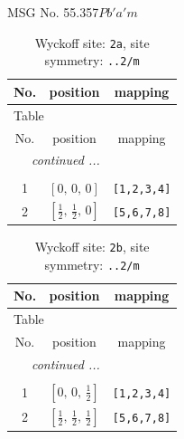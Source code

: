 \documentclass[fleqn,8pt]{jsarticle}
\begin{document}
\setcounter{MaxMatrixCols}{32}

\renewcommand{\tablename}{Table~}
\renewcommand{\figurename}{Figure~}
\begin{center}
\LARGE
MSG No. 55.357\quad$Pb'a'm$
\end{center}
\renewcommand{\arraystretch}{1.2}
\begin{longtable}{ccc}
\caption{Wyckoff site: {\tt 2a}, site symmetry: {\tt ..2/m}}
 \\
 \hline \hline
No. & position & mapping \\ \hline \endfirsthead

\multicolumn{2}{l}{\tablename\ \thetable{}} \\
 \hline \hline
No. & position & mapping \\ \hline \endhead

 \hline \hline
\multicolumn{2}{r}{\footnotesize\it continued ...} \\ \endfoot

 \hline \hline
\multicolumn{2}{r}{} \\ \endlastfoot

1 & $\left[ 0,\, 0,\, 0 \right]$ & {\tt [1,2,3,4]} \\ \hline
2 & $\left[ \frac{1}{2},\, \frac{1}{2},\, 0 \right]$ & {\tt [5,6,7,8]} \\
\end{longtable}
\renewcommand{\arraystretch}{1.2}
\begin{longtable}{ccc}
\caption{Wyckoff site: {\tt 2b}, site symmetry: {\tt ..2/m}}
 \\
 \hline \hline
No. & position & mapping \\ \hline \endfirsthead

\multicolumn{2}{l}{\tablename\ \thetable{}} \\
 \hline \hline
No. & position & mapping \\ \hline \endhead

 \hline \hline
\multicolumn{2}{r}{\footnotesize\it continued ...} \\ \endfoot

 \hline \hline
\multicolumn{2}{r}{} \\ \endlastfoot

1 & $\left[ 0,\, 0,\, \frac{1}{2} \right]$ & {\tt [1,2,3,4]} \\ \hline
2 & $\left[ \frac{1}{2},\, \frac{1}{2},\, \frac{1}{2} \right]$ & {\tt [5,6,7,8]} \\
\end{longtable}
\end{document}
